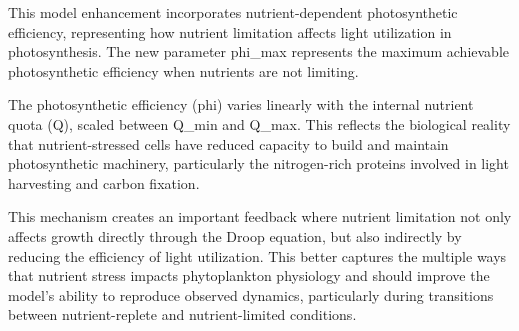 This model enhancement incorporates nutrient-dependent photosynthetic efficiency, representing how nutrient limitation affects light utilization in photosynthesis. The new parameter phi_max represents the maximum achievable photosynthetic efficiency when nutrients are not limiting.

The photosynthetic efficiency (phi) varies linearly with the internal nutrient quota (Q), scaled between Q_min and Q_max. This reflects the biological reality that nutrient-stressed cells have reduced capacity to build and maintain photosynthetic machinery, particularly the nitrogen-rich proteins involved in light harvesting and carbon fixation.

This mechanism creates an important feedback where nutrient limitation not only affects growth directly through the Droop equation, but also indirectly by reducing the efficiency of light utilization. This better captures the multiple ways that nutrient stress impacts phytoplankton physiology and should improve the model's ability to reproduce observed dynamics, particularly during transitions between nutrient-replete and nutrient-limited conditions.

